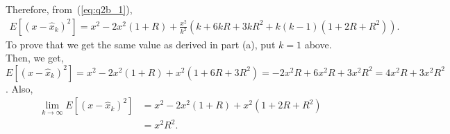 Therefore, from~(\ref{eq:q2b_1}),
\begin{align*}
	E[(x-\hat{x}_k)^2] = x^2-2x^2(1+R) + \frac{x^2}{k^2}\left(k+6kR+3kR^2 + k(k-1)(1+2R+R^2)\right).
\end{align*}
To prove that we get the same value as derived in part (a), put $k=1$ above. Then, we get, $E[(x-\hat{x}_k)^2] = x^2-2x^2(1+R)+x^2(1+6R+3R^2)=-2x^2R+6x^2R+3x^2R^2=4x^2R+3x^2R^2$.
Also,
\begin{align*}
	\lim_{k \to \infty}E[(x-\hat{x}_k)^2] &= x^2-2x^2(1+R)+x^2(1+2R+R^2)\\
	&= x^2R^2.
\end{align*}